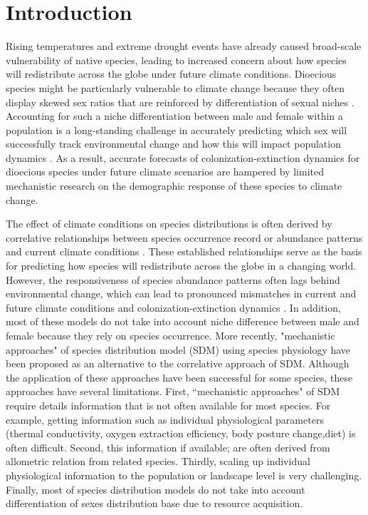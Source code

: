 \documentclass[11pt]{article}
\begin{document}
\section*{Introduction}
Rising temperatures and extreme drought events have already caused broad-scale vulnerability of native species, leading to increased concern about how species will redistribute across the globe under future climate conditions.
Dioecious species might be particularly vulnerable to climate change because they often display skewed sex ratios that are reinforced by differentiation of sexual niches \citep{Tognetti2012}. 
Accounting for such a niche differentiation between male and female within a population is a long-standing challenge in accurately predicting which sex will successfully track environmental change and how this will impact population dynamics \citep{jones1999sex}. 
As a result, accurate forecasts of colonization-extinction dynamics for dioecious species under future climate scenarios are hampered by limited mechanistic research on the demographic response of these species to climate change.

The effect of climate conditions on species distributions is often derived by correlative relationships between species occurrence record or abundance patterns and current climate conditions \citep{elith2009species}.  
These established relationships serve as the basis for predicting how species will redistribute across the globe in a changing world. 
However, the responsiveness of species abundance patterns often lags behind environmental change, which can lead to pronounced mismatches in current and future climate conditions and colonization-extinction dynamics \citep{a2022species}. In addition, most of these models do not take into account niche difference between male and female because they rely on species occurrence.
More recently, "mechanistic approaches" of  species distribution model (SDM) using species physiology have been proposed as an alternative to the correlative approach of SDM. 
Although the application of these approaches have been successful for some species, these approaches have several limitations. 
First, “mechanistic approaches" of SDM require details information that is not often available for most species.
For example, getting information such as individual physiological parameters (thermal conductivity, oxygen extraction efficiency, body posture change,diet) is often difficult.  
Second, this information if available; are often derived from allometric relation from related species. 
Thirdly, scaling up individual physiological information to the population or landscape level is very challenging.
Finally, most of species distribution models do not take into account differentiation of sexes distribution base due to resource acquisition. 
\end{document}
